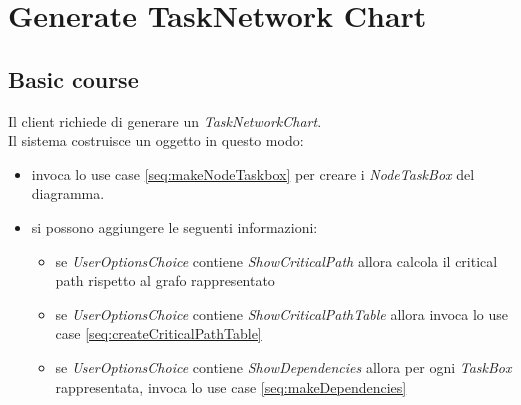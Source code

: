 \section{Generate TaskNetwork Chart}
\label{seq:generateTNChart}

\subsection{Basic course}
Il client richiede di generare un \emph{TaskNetworkChart}.\\
Il sistema costruisce un oggetto in questo modo:
\begin{itemize}
   \item invoca lo use case \ref{seq:makeNodeTaskbox} per creare i
  \emph{NodeTaskBox} del diagramma.
  \item si possono aggiungere le seguenti informazioni:
  \begin{itemize}
    \item se \emph{UserOptionsChoice} contiene \emph{ShowCriticalPath} allora
    	calcola il critical path rispetto al grafo rappresentato
    \item se \emph{UserOptionsChoice} contiene \emph{ShowCriticalPathTable}
    allora invoca lo use case \ref{seq:createCriticalPathTable}
 	\item se \emph{UserOptionsChoice} contiene \emph{ShowDependencies} allora per
 	 ogni \emph{TaskBox} rappresentata, invoca lo use case \ref{seq:makeDependencies}
  \end{itemize}
\end{itemize}